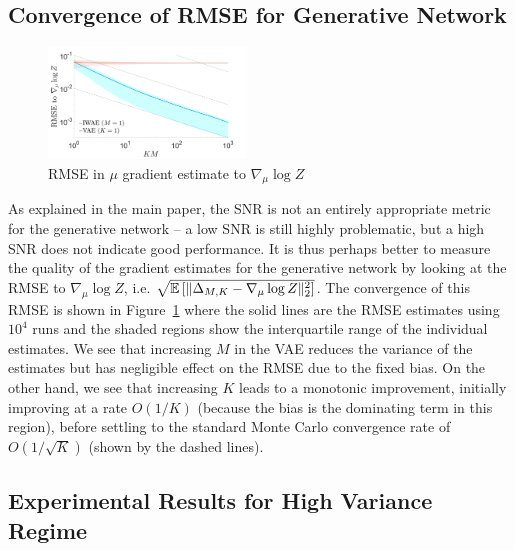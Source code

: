 \subsection{Convergence of RMSE for Generative Network}
\label{sec:app:rmse}

\begin{figure}
	\centering
	\vspace{-15pt}
	\includegraphics[width=0.47\textwidth]{figures/tighter_bounds/mse_mu}
	\vspace{-10pt}
	\caption{RMSE in $\mu$ gradient estimate to $\nabla_{\mu} \log Z$ 
		\label{fig:snr/rmse}}
	\vspace{-8pt}
\end{figure} 
As explained in the main paper, the SNR is not an entirely appropriate metric for
the generative network -- a low SNR is still highly problematic, but a high SNR
does not indicate good performance.
It is thus perhaps better to measure
the quality of the gradient estimates for the generative network by looking at the \gls{RMSE}
to $\nabla_{\mu} \log Z$, i.e. $\sqrt{\mathbb{E} \left[\lVert\Delta_{M,K}-\nabla_{\mu} \log Z\rVert_2^2\right]}$.
The convergence of this \gls{RMSE}  is shown in
Figure~\ref{fig:snr/rmse} where the solid lines are the \gls{RMSE} estimates using $10^4$ runs 
and the shaded regions
show the interquartile range of the individual estimates. We see that increasing 
$M$ in the \gls{VAE} reduces the variance
of the estimates but has negligible effect on the \gls{RMSE} due to the fixed bias.  On the
other hand,
we see that increasing $K$ leads to a monotonic improvement, initially improving
at a rate $O(1/K)$ (because the bias is the dominating term in this region),
before settling to the standard Monte Carlo convergence rate of $O(1/\sqrt{K})$
(shown by the dashed lines).

\subsection{Experimental Results for High Variance Regime}
\label{sec:hv}

\vspace{-4pt}


